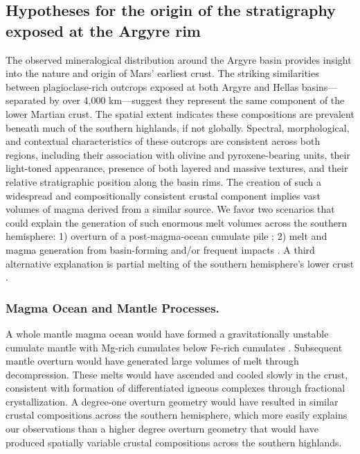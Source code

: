 \documentclass[12pt]{article}
\begin{document}
\subsection*{Hypotheses for the origin of the stratigraphy exposed at the Argyre rim}

The observed mineralogical distribution around the Argyre basin provides insight into the nature and origin of Mars' earliest crust. The striking similarities between plagioclase-rich outcrops exposed at both Argyre and Hellas basins---separated by over 4,000 km---suggest they represent the same component of the lower Martian crust. The spatial extent indicates these compositions are prevalent beneath much of the southern highlands, if not globally. Spectral, morphological, and contextual characteristics of these outcrops are consistent across both regions, including their association with olivine and pyroxene-bearing units, their light-toned appearance, presence of both layered and massive textures, and their relative stratigraphic position along the basin rims. The creation of such a widespread and compositionally consistent crustal component implies vast volumes of magma derived from a similar source. We favor two scenarios that could explain the generation of such enormous melt volumes across the southern hemisphere: 1) overturn of a post-magma-ocean cumulate pile \citep{Borg2003, Elkins-Tanton2005}; 2) melt and magma generation from basin-forming and/or frequent impacts \citep{Koeppel2020, Manske2021, Black2024}. A third alternative explanation is partial melting of the southern hemisphere's lower crust \citep{BonnetGibet2025, Bernadet2025}.

\subsubsection*{Magma Ocean and Mantle Processes.} 

A whole mantle magma ocean would have formed a gravitationally unstable cumulate mantle with Mg-rich cumulates below Fe-rich cumulates \citep{Elkins-Tanton2005}. Subsequent mantle overturn would have generated large volumes of melt through decompression. These melts would have ascended and cooled slowly in the crust, consistent with formation of differentiated igneous complexes through fractional crystallization. A degree-one overturn geometry \citep{Borg2003, Elkins-Tanton2005, Debaille2008} would have resulted in similar crustal compositions across the southern hemisphere, which more easily explains our observations than a higher degree overturn geometry \citep{Scheinberg2014} that would have produced spatially variable crustal compositions across the southern highlands.
\end{document}
